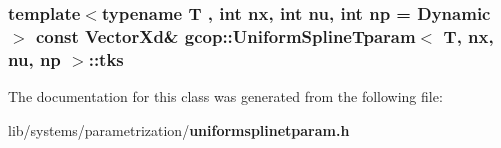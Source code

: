 \subsubsection[{tks}]{\setlength{\rightskip}{0pt plus 5cm}template$<$typename T , int nx, int nu, int np = \-Dynamic$>$ const \-Vector\-Xd\& {\bf gcop\-::\-Uniform\-Spline\-Tparam}$<$ \-T, nx, nu, {\bf np} $>$\-::{\bf tks}}\label{classgcop_1_1UniformSplineTparam_a3eef37b4f31943573df42a8721d6b269}


\-The documentation for this class was generated from the following file\-:\begin{DoxyCompactItemize}
\item 
lib/systems/parametrization/{\bf uniformsplinetparam.\-h}\end{DoxyCompactItemize}
